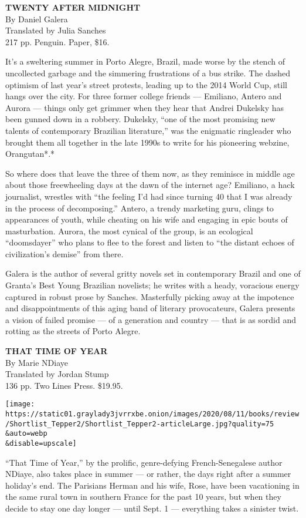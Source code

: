 \textbf{\textbf{TWENTY AFTER MIDNIGHT}}\\
By Daniel Galera\\
Translated by Julia Sanches\\
217 pp. Penguin. Paper, \$16.

It's a sweltering summer in Porto Alegre, Brazil, made worse by the
stench of uncollected garbage and the simmering frustrations of a bus
strike. The dashed optimism of last year's street protests, leading up
to the 2014 World Cup, still hangs over the city. For three former
college friends --- Emiliano, Antero and Aurora --- things only get
grimmer when they hear that Andrei Dukelsky has been gunned down in a
robbery. Dukelsky, ``one of the most promising new talents of
contemporary Brazilian literature,'' was the enigmatic ringleader who
brought them all together in the late 1990s to write for his pioneering
webzine, Orangutan*.*

So where does that leave the three of them now, as they reminisce in
middle age about those freewheeling days at the dawn of the internet
age? Emiliano, a hack journalist, wrestles with ``the feeling I'd had
since turning 40 that I was already in the process of decomposing.''
Antero, a trendy marketing guru, clings to appearances of youth, while
cheating on his wife and engaging in epic bouts of masturbation. Aurora,
the most cynical of the group, is an ecological ``doomsdayer'' who plans
to flee to the forest and listen to ``the distant echoes of
civilization's demise'' from there.

Galera is the author of several gritty novels set in contemporary Brazil
and one of Granta's Best Young Brazilian novelists; he writes with a
heady, voracious energy captured in robust prose by Sanches. Masterfully
picking away at the impotence and disappointments of this aging band of
literary provocateurs, Galera presents a vision of failed promise --- of
a generation and country --- that is as sordid and rotting as the
streets of Porto Alegre.

\textbf{\textbf{THAT TIME OF YEAR}}\\
By Marie NDiaye\\
Translated by Jordan Stump\\
136 pp. Two Lines Press. \$19.95.

\texttt{[image: https://static01.graylady3jvrrxbe.onion/images/2020/08/11/books/review/Shortlist\_Tepper2/Shortlist\_Tepper2-articleLarge.jpg?quality=75\\\&auto=webp\\\&disable=upscale]}

``That Time of Year,'' by the prolific, genre-defying French-Senegalese
author NDiaye, also takes place in summer --- or rather, the days right
after a summer holiday's end. The Parisians Herman and his wife, Rose,
have been vacationing in the same rural town in southern France for the
past 10 years, but when they decide to stay one day longer --- until
Sept. 1 --- everything takes a sinister twist.

